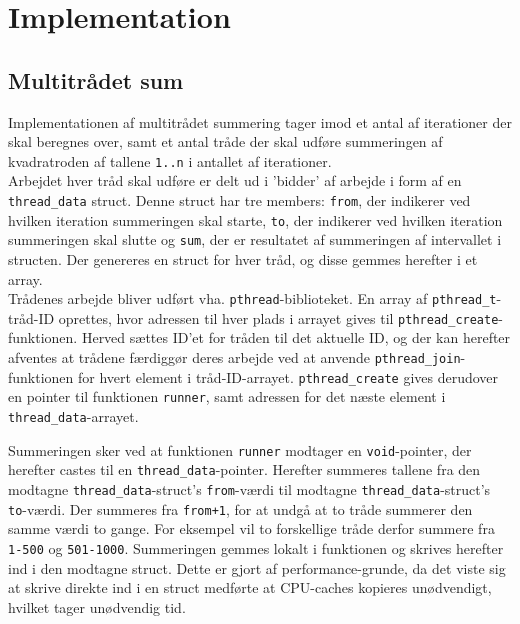 \section{Implementation}

\subsection{Multitrådet sum}
Implementationen af multitrådet summering tager imod et antal af iterationer der skal beregnes over, samt et antal tråde der skal udføre summeringen af kvadratroden af tallene \texttt{1..n} i antallet af iterationer. \\

Arbejdet hver tråd skal udføre er delt ud i 'bidder' af arbejde i form af en \texttt{thread\_data} struct. Denne struct har tre members: \texttt{from}, der indikerer ved hvilken iteration summeringen skal starte, \texttt{to}, der indikerer ved hvilken iteration summeringen skal slutte og \texttt{sum}, der er resultatet af summeringen af intervallet i structen. Der genereres en struct for hver tråd, og disse gemmes herefter i et array.\\

Trådenes arbejde bliver udført vha. \texttt{pthread}-biblioteket. En array af \texttt{pthread\_t}-tråd-ID oprettes, hvor adressen til hver plads i arrayet gives til \texttt{pthread\_create}-funktionen. Herved sættes ID'et for tråden til det aktuelle ID, og der kan herefter afventes at trådene færdiggør deres arbejde ved at anvende \texttt{pthread\_join}-funktionen for hvert element i tråd-ID-arrayet.
\texttt{pthread\_create} gives derudover en pointer til funktionen \texttt{runner}, samt adressen for det næste element i \texttt{thread\_data}-arrayet. 

Summeringen sker ved at funktionen \texttt{runner} modtager en \texttt{void}-pointer, der herefter castes til en \texttt{thread\_data}-pointer.
Herefter summeres tallene fra den modtagne \texttt{thread\_data}-struct's \texttt{from}-værdi til modtagne \texttt{thread\_data}-struct's \texttt{to}-værdi. Der summeres fra \texttt{from+1}, for at undgå at to tråde summerer den samme værdi to gange. For eksempel vil to forskellige tråde derfor summere fra \texttt{1-500} og \texttt{501-1000}.
Summeringen gemmes lokalt i funktionen og skrives herefter ind i den modtagne struct. Dette er gjort af performance-grunde, da det viste sig at skrive direkte ind i en struct medførte at CPU-caches kopieres unødvendigt, hvilket tager unødvendig tid. \\

